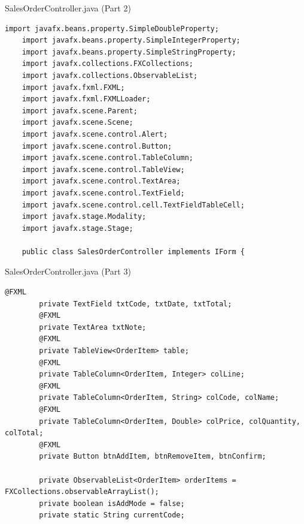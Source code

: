 \documentclass[aspectratio=169, table]{beamer}
\begin{document}
\begin{frame}[fragile]{SalesOrderController.java (Part 2)}
\vspace{20pt}
\begin{lstlisting}[style=JavaStyle]
	import javafx.beans.property.SimpleDoubleProperty;
	import javafx.beans.property.SimpleIntegerProperty;
	import javafx.beans.property.SimpleStringProperty;
	import javafx.collections.FXCollections;
	import javafx.collections.ObservableList;
	import javafx.fxml.FXML;
	import javafx.fxml.FXMLLoader;
	import javafx.scene.Parent;
	import javafx.scene.Scene;
	import javafx.scene.control.Alert;
	import javafx.scene.control.Button;
	import javafx.scene.control.TableColumn;
	import javafx.scene.control.TableView;
	import javafx.scene.control.TextArea;
	import javafx.scene.control.TextField;
	import javafx.scene.control.cell.TextFieldTableCell;
	import javafx.stage.Modality;
	import javafx.stage.Stage;
	
	public class SalesOrderController implements IForm {
	\end{lstlisting}
\end{frame}

\begin{frame}[fragile]{SalesOrderController.java (Part 3)}
	\vspace{20pt}
	\begin{lstlisting}[style=JavaStyle]
		@FXML
		private TextField txtCode, txtDate, txtTotal;
		@FXML
		private TextArea txtNote;
		@FXML
		private TableView<OrderItem> table;
		@FXML
		private TableColumn<OrderItem, Integer> colLine;
		@FXML
		private TableColumn<OrderItem, String> colCode, colName;
		@FXML
		private TableColumn<OrderItem, Double> colPrice, colQuantity, colTotal;
		@FXML
		private Button btnAddItem, btnRemoveItem, btnConfirm;
		
		private ObservableList<OrderItem> orderItems = FXCollections.observableArrayList();
		private boolean isAddMode = false;
		private static String currentCode;
	\end{lstlisting}
\end{frame}
\end{document}
